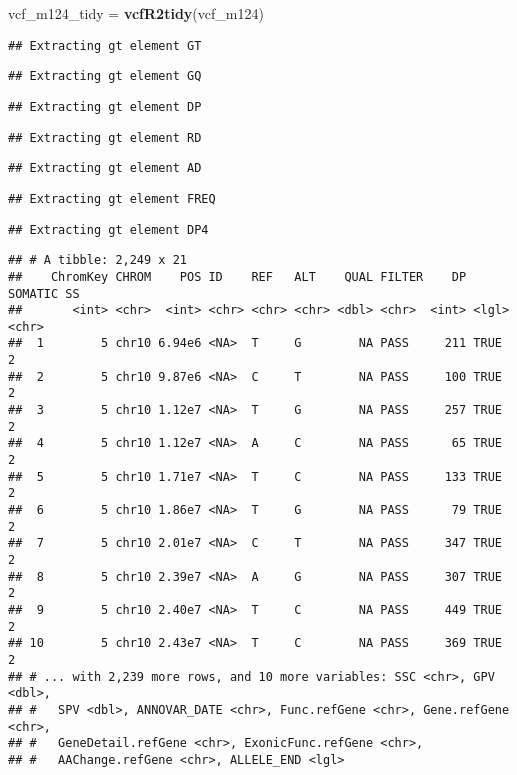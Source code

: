 \documentclass[]{article}
\newenvironment{Shaded}{\begin{snugshade}}{\end{snugshade}}
\newcommand{\KeywordTok}[1]{\textcolor[rgb]{0.13,0.29,0.53}{\textbf{#1}}}
\newcommand{\NormalTok}[1]{#1}
\newcommand{\OperatorTok}[1]{\textcolor[rgb]{0.81,0.36,0.00}{\textbf{#1}}}
\newcommand{\StringTok}[1]{\textcolor[rgb]{0.31,0.60,0.02}{#1}}
\begin{document}
\begin{Shaded}
\begin{Highlighting}[]
\NormalTok{vcf_m124_tidy =}\StringTok{ }\KeywordTok{vcfR2tidy}\NormalTok{(vcf_m124)}
\end{Highlighting}
\end{Shaded}

\begin{verbatim}
## Extracting gt element GT
\end{verbatim}

\begin{verbatim}
## Extracting gt element GQ
\end{verbatim}

\begin{verbatim}
## Extracting gt element DP
\end{verbatim}

\begin{verbatim}
## Extracting gt element RD
\end{verbatim}

\begin{verbatim}
## Extracting gt element AD
\end{verbatim}

\begin{verbatim}
## Extracting gt element FREQ
\end{verbatim}

\begin{verbatim}
## Extracting gt element DP4
\end{verbatim}

\begin{Shaded}
\end{Shaded}

\begin{verbatim}
## # A tibble: 2,249 x 21
##    ChromKey CHROM    POS ID    REF   ALT    QUAL FILTER    DP SOMATIC SS   
##       <int> <chr>  <int> <chr> <chr> <chr> <dbl> <chr>  <int> <lgl>   <chr>
##  1        5 chr10 6.94e6 <NA>  T     G        NA PASS     211 TRUE    2    
##  2        5 chr10 9.87e6 <NA>  C     T        NA PASS     100 TRUE    2    
##  3        5 chr10 1.12e7 <NA>  T     G        NA PASS     257 TRUE    2    
##  4        5 chr10 1.12e7 <NA>  A     C        NA PASS      65 TRUE    2    
##  5        5 chr10 1.71e7 <NA>  T     C        NA PASS     133 TRUE    2    
##  6        5 chr10 1.86e7 <NA>  T     G        NA PASS      79 TRUE    2    
##  7        5 chr10 2.01e7 <NA>  C     T        NA PASS     347 TRUE    2    
##  8        5 chr10 2.39e7 <NA>  A     G        NA PASS     307 TRUE    2    
##  9        5 chr10 2.40e7 <NA>  T     C        NA PASS     449 TRUE    2    
## 10        5 chr10 2.43e7 <NA>  T     C        NA PASS     369 TRUE    2    
## # ... with 2,239 more rows, and 10 more variables: SSC <chr>, GPV <dbl>,
## #   SPV <dbl>, ANNOVAR_DATE <chr>, Func.refGene <chr>, Gene.refGene <chr>,
## #   GeneDetail.refGene <chr>, ExonicFunc.refGene <chr>,
## #   AAChange.refGene <chr>, ALLELE_END <lgl>
\end{verbatim}
\end{document}
